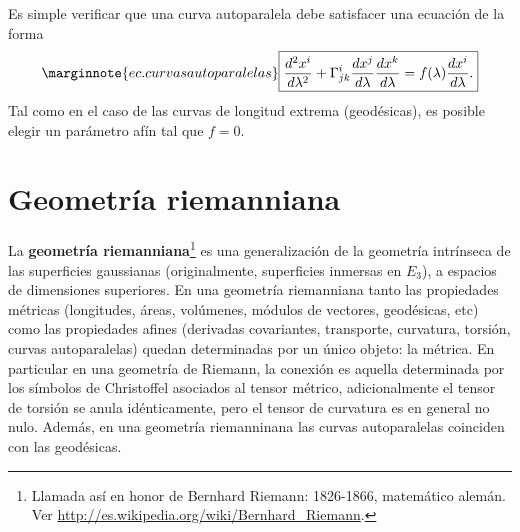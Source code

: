 Es simple verificar que una curva autoparalela debe satisfacer una ecuación de la forma
\begin{equation}\marginnote{ec. curvas autoparalelas}
\boxed{\frac{d^2x^i}{d\lambda^2}+\Gamma_{jk}^i \frac{dx^j}{d\lambda}
\frac{dx^k}{d\lambda} =f(\lambda)\frac{dx^i}{d\lambda}.}
\end{equation}
Tal como en el caso de las curvas de longitud extrema (geodésicas), es posible elegir un parámetro afín tal que $f=0$. 
%

\section{Geometría riemanniana}

La \textbf{geometría riemanniana}\footnote{Llamada así en honor de Bernhard Riemann: 1826-1866, matemático alemán. Ver \url{http://es.wikipedia.org/wiki/Bernhard_Riemann}.} es una generalización de la geometría intrínseca de las superficies gaussianas (originalmente, superficies inmersas en $E_3$), a espacios de dimensiones superiores. En una geometría riemanniana tanto las propiedades métricas (longitudes, áreas, volúmenes, módulos de vectores, geodésicas, etc) como las propiedades afines (derivadas covariantes, transporte, curvatura, torsión, curvas autoparalelas) quedan determinadas por un único objeto: la métrica. En particular en una geometría de Riemann, la conexión es aquella determinada por los símbolos de Christoffel asociados al tensor métrico, adicionalmente el tensor de torsión se anula idénticamente, pero el tensor de curvatura es en general no nulo. Además, en una geometría riemanninana las curvas autoparalelas coinciden con las geodésicas.



